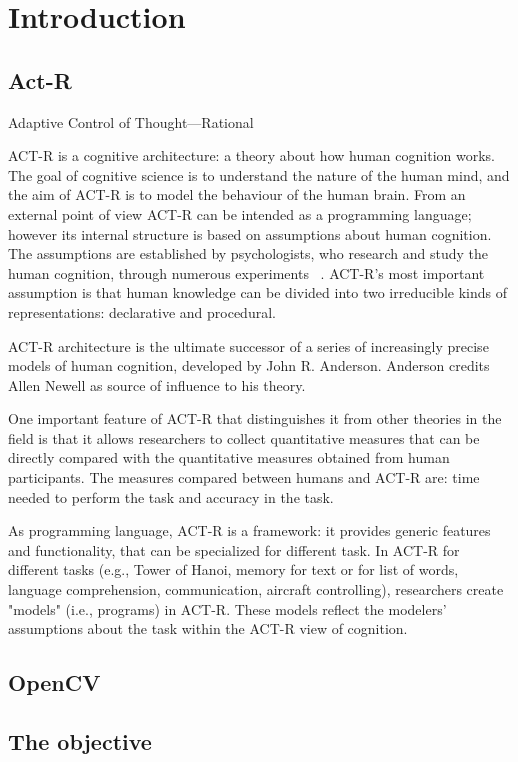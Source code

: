 \chapter{Introduction}
\section{Act-R}
Adaptive Control of Thought—Rational

ACT-R is a cognitive architecture: a theory about how human cognition works. The goal of cognitive science is to understand the nature of the human mind, and the aim of ACT-R is to model the behaviour of the human brain. 
From an external point of view ACT-R can be intended as a programming language; however its internal structure is based on assumptions about human cognition. The assumptions are established by psychologists, who research and study the human cognition, through numerous experiments ~\cite{Allen94}. ACT-R's most important assumption is that human knowledge can be divided into two irreducible kinds of representations: declarative and procedural.

ACT-R architecture is the ultimate successor of a series of increasingly precise models of human cognition, developed by John R. Anderson. Anderson credits Allen Newell as source of influence to his theory.

One important feature of ACT-R that distinguishes it from other theories in the field is that it allows researchers to collect quantitative measures that can be directly compared with the quantitative measures obtained from human participants. The measures compared between humans and ACT-R are: time needed to perform the task and accuracy in the task.

As programming language, ACT-R is a framework: it provides generic features and functionality, that can be specialized for different task. In ACT-R for different tasks 
(e.g., Tower of Hanoi, memory for text or for list of words, language comprehension, 
communication, aircraft controlling), researchers create "models" (i.e., programs) in ACT-R. 
These models reflect the modelers' assumptions about the task within the ACT-R view of 
cognition.
\section{OpenCV}
\section{The objective}
